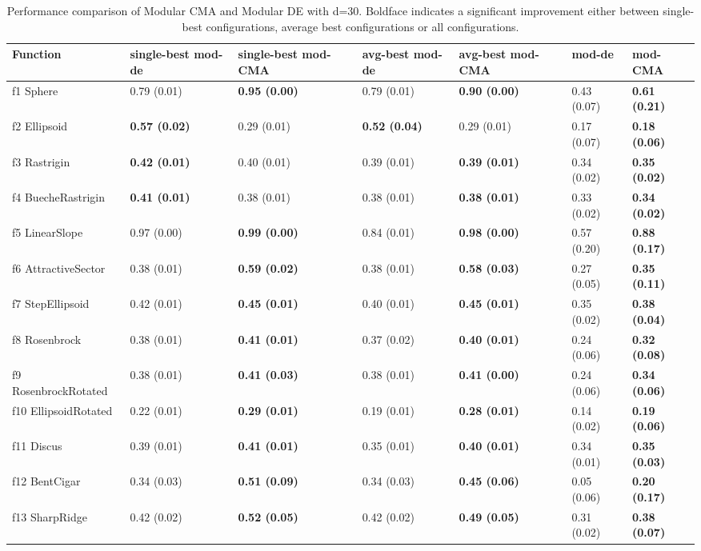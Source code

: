 \begin{table}
\caption{Performance comparison of Modular CMA and Modular DE with d=30. Boldface indicates a significant improvement either between single-best configurations, average best configurations or all configurations.}
\begin{tabular}{lllllll}
\toprule
Function & single-best mod-de & single-best mod-CMA & avg-best mod-de & avg-best mod-CMA & mod-de & mod-CMA \\
\midrule
f1 Sphere & 0.79 (0.01) & \textbf{0.95 (0.00)} & 0.79 (0.01) & \textbf{0.90 (0.00)} & 0.43 (0.07) & \textbf{0.61 (0.21)} \\
f2 Ellipsoid & \textbf{0.57 (0.02)} & 0.29 (0.01) & \textbf{0.52 (0.04)} & 0.29 (0.01) & 0.17 (0.07) & \textbf{0.18 (0.06)} \\
f3 Rastrigin & \textbf{0.42 (0.01)} & 0.40 (0.01) & 0.39 (0.01) & \textbf{0.39 (0.01)} & 0.34 (0.02) & \textbf{0.35 (0.02)} \\
f4 BuecheRastrigin & \textbf{0.41 (0.01)} & 0.38 (0.01) & 0.38 (0.01) & \textbf{0.38 (0.01)} & 0.33 (0.02) & \textbf{0.34 (0.02)} \\
f5 LinearSlope & 0.97 (0.00) & \textbf{0.99 (0.00)} & 0.84 (0.01) & \textbf{0.98 (0.00)} & 0.57 (0.20) & \textbf{0.88 (0.17)} \\
f6 AttractiveSector & 0.38 (0.01) & \textbf{0.59 (0.02)} & 0.38 (0.01) & \textbf{0.58 (0.03)} & 0.27 (0.05) & \textbf{0.35 (0.11)} \\
f7 StepEllipsoid & 0.42 (0.01) & \textbf{0.45 (0.01)} & 0.40 (0.01) & \textbf{0.45 (0.01)} & 0.35 (0.02) & \textbf{0.38 (0.04)} \\
f8 Rosenbrock & 0.38 (0.01) & \textbf{0.41 (0.01)} & 0.37 (0.02) & \textbf{0.40 (0.01)} & 0.24 (0.06) & \textbf{0.32 (0.08)} \\
f9 RosenbrockRotated & 0.38 (0.01) & \textbf{0.41 (0.03)} & 0.38 (0.01) & \textbf{0.41 (0.00)} & 0.24 (0.06) & \textbf{0.34 (0.06)} \\
f10 EllipsoidRotated & 0.22 (0.01) & \textbf{0.29 (0.01)} & 0.19 (0.01) & \textbf{0.28 (0.01)} & 0.14 (0.02) & \textbf{0.19 (0.06)} \\
f11 Discus & 0.39 (0.01) & \textbf{0.41 (0.01)} & 0.35 (0.01) & \textbf{0.40 (0.01)} & 0.34 (0.01) & \textbf{0.35 (0.03)} \\
f12 BentCigar & 0.34 (0.03) & \textbf{0.51 (0.09)} & 0.34 (0.03) & \textbf{0.45 (0.06)} & 0.05 (0.06) & \textbf{0.20 (0.17)} \\
f13 SharpRidge & 0.42 (0.02) & \textbf{0.52 (0.05)} & 0.42 (0.02) & \textbf{0.49 (0.05)} & 0.31 (0.02) & \textbf{0.38 (0.07)} \\

\end{tabular}
\end{table}
